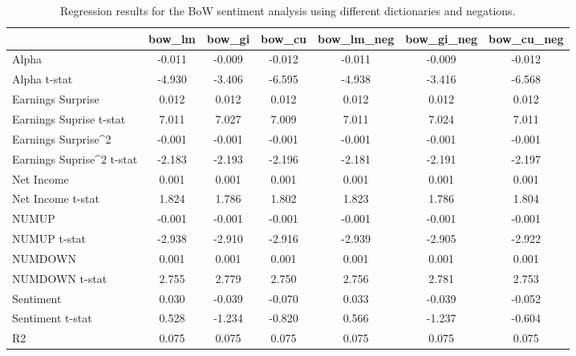 \begin{table}
\caption{Regression results for the BoW sentiment analysis using different dictionaries and negations.}
\label{tab:bow_regressions}
\begin{tabular}{lcccccc}
\toprule
 & bow_lm & bow_gi & bow_cu & bow_lm_neg & bow_gi_neg & bow_cu_neg \\
\midrule
Alpha & -0.011 & -0.009 & -0.012 & -0.011 & -0.009 & -0.012 \\
Alpha t-stat & -4.930 & -3.406 & -6.595 & -4.938 & -3.416 & -6.568 \\
Earnings Surprise & 0.012 & 0.012 & 0.012 & 0.012 & 0.012 & 0.012 \\
Earnings Suprise t-stat & 7.011 & 7.027 & 7.009 & 7.011 & 7.024 & 7.011 \\
Earnings Surprise^2 & -0.001 & -0.001 & -0.001 & -0.001 & -0.001 & -0.001 \\
Earnings Suprise^2 t-stat & -2.183 & -2.193 & -2.196 & -2.181 & -2.191 & -2.197 \\
Net Income & 0.001 & 0.001 & 0.001 & 0.001 & 0.001 & 0.001 \\
Net Income t-stat & 1.824 & 1.786 & 1.802 & 1.823 & 1.786 & 1.804 \\
NUMUP & -0.001 & -0.001 & -0.001 & -0.001 & -0.001 & -0.001 \\
NUMUP t-stat & -2.938 & -2.910 & -2.916 & -2.939 & -2.905 & -2.922 \\
NUMDOWN & 0.001 & 0.001 & 0.001 & 0.001 & 0.001 & 0.001 \\
NUMDOWN t-stat & 2.755 & 2.779 & 2.750 & 2.756 & 2.781 & 2.753 \\
Sentiment & 0.030 & -0.039 & -0.070 & 0.033 & -0.039 & -0.052 \\
Sentiment t-stat & 0.528 & -1.234 & -0.820 & 0.566 & -1.237 & -0.604 \\
R2 & 0.075 & 0.075 & 0.075 & 0.075 & 0.075 & 0.075 \\
\bottomrule
\end{tabular}
\end{table}
